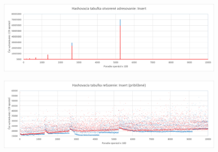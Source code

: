 \documentclass[a4paper,slovak,12pt]{article}
\begin{document}
    \begin{figure}[!htbp]
        \centering
        \label{fig:figure5}
        \includegraphics[width=\textwidth]{HashSC_Insert}
    \end{figure}
    \begin{figure}[!htbp]
        \centering
        \label{fig:figure6}
        \includegraphics[width=\textwidth]{HashSC_Insert_zoomed}
    \end{figure}

    \FloatBarrier

    \newpage
    \FloatBarrier

    

    \newpage
\end{document}
